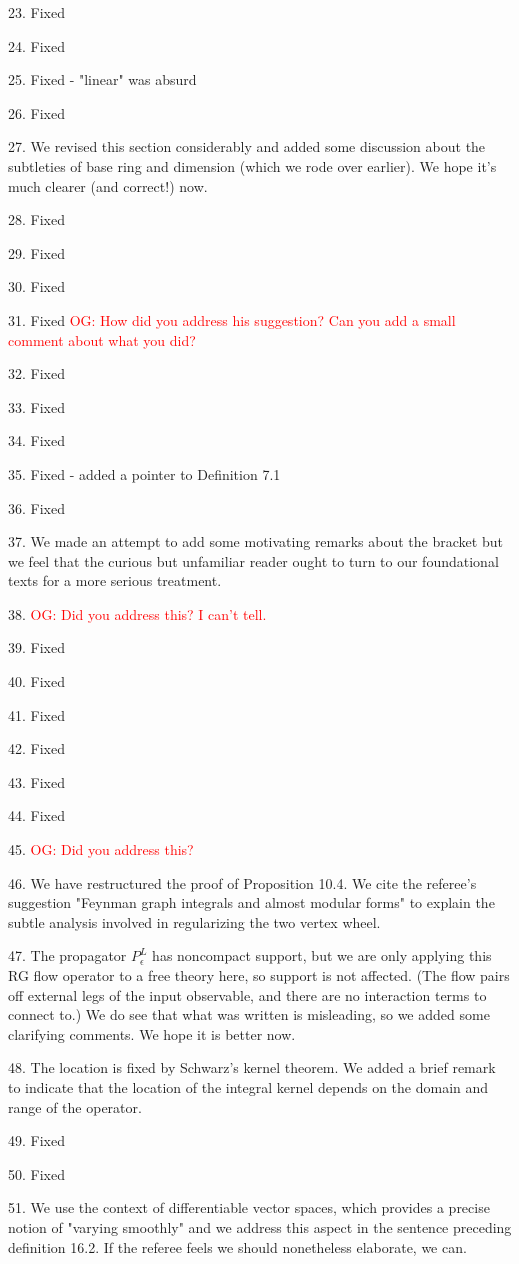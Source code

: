 \documentclass[10pt]{amsart}
\def\owen{\textcolor{red}{OG: }\textcolor{red}}
\begin{document}
23. Fixed

24. Fixed

25. Fixed - "linear" was absurd

26. Fixed

27. We revised this section considerably and added some discussion about the subtleties of base ring and dimension (which we rode over earlier). We hope it's much clearer (and correct!) now.

28. Fixed

29. Fixed

30. Fixed

31. Fixed \owen{How did you address his suggestion? Can you add a small comment about what you did?}

32. Fixed

33. Fixed

34. Fixed

35. Fixed - added a pointer to Definition 7.1

36. Fixed

37. We made an attempt to add some motivating remarks about the bracket but we feel that the curious but unfamiliar reader ought to turn to our foundational texts for a more serious treatment.

38. \owen{Did you address this? I can't tell.}

39. Fixed

40. Fixed

41. Fixed

42. Fixed

43. Fixed

44. Fixed

45.  \owen{Did you address this?}

46. We have restructured the proof of Proposition 10.4.
We cite the referee's suggestion "Feynman graph integrals and almost modular forms" to explain the subtle analysis involved in regularizing the two vertex wheel.

47. The propagator $P^L_\epsilon$ has noncompact support, but we are only applying this RG flow operator to a free theory here, so support is not affected. (The flow pairs off external legs of the input observable, and there are no interaction terms to connect to.) We do see that what was written is misleading, so we added some clarifying comments. We hope it is better now.

48. The location is fixed by Schwarz's kernel theorem. We added a brief remark to indicate that the location of the integral kernel depends on the domain and range of the operator.

49. Fixed

50. Fixed

51. We use the context of differentiable vector spaces, which provides a precise notion of "varying smoothly" and we address this aspect in the sentence preceding definition 16.2. If the referee feels we should nonetheless elaborate, we can.
\end{document}
